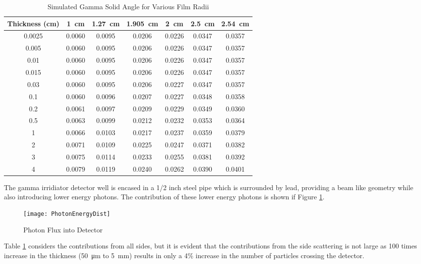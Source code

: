 \documentclass[draftcls,onecolumn]{IEEEtran}
\begin{document}
\begin{table}
	\centering
	\caption{Simulated Gamma Solid Angle for Various Film Radii}
	\label{tab:GammaSolidAngle}
	\begin{tabular}{c | c c c c c c}
Thickness (\si{\cm})	&	\SI{1}{\cm}	&	\SI{1.27}{\cm}	&	\SI{1.905}{\cm}	&	\SI{2}{\cm}	&	\SI{2.5}{\cm}	&	\SI{2.54}{\cm} \\ \hline
0.0025	&	0.0060	&	0.0095	&	0.0206	&	0.0226	&	0.0347	&	0.0357\\
0.005	&	0.0060	&	0.0095	&	0.0206	&	0.0226	&	0.0347	&	0.0357\\
0.01	&	0.0060	&	0.0095	&	0.0206	&	0.0226	&	0.0347	&	0.0357\\
0.015	&	0.0060	&	0.0095	&	0.0206	&	0.0226	&	0.0347	&	0.0357\\
0.03	&	0.0060	&	0.0095	&	0.0206	&	0.0227	&	0.0347	&	0.0357\\
0.1	&	0.0060	&	0.0096	&	0.0207	&	0.0227	&	0.0348	&	0.0358\\
0.2	&	0.0061	&	0.0097	&	0.0209	&	0.0229	&	0.0349	&	0.0360\\
0.5	&	0.0063	&	0.0099	&	0.0212	&	0.0232	&	0.0353	&	0.0364\\
1	&	0.0066	&	0.0103	&	0.0217	&	0.0237	&	0.0359	&	0.0379\\
2	&	0.0071	&	0.0109	&	0.0225	&	0.0247	&	0.0371	&	0.0382\\
3	&	0.0075	&	0.0114	&	0.0233	&	0.0255	&	0.0381	&	0.0392\\
4	&	0.0079	&	0.0119	&	0.0240	&	0.0262	&	0.0390	&	0.0401\\
	\end{tabular}
\end{table}
The gamma irridiator detector well is encased in a 1/2 inch steel pipe which is surrounded by lead, providing a beam like geometry while also introducing lower energy photons. 
The contribution of these lower energy photons is shown if Figure \ref{fig:PhotonFluxAllEnergies}.
\begin{figure}
  \texttt{[image: PhotonEnergyDist]}
	\caption{Photon Flux into Detector}
  \label{fig:PhotonFluxAllEnergies}
\end{figure}
Table \ref{tab:GammaSolidAngle} considers the contributions from all sides, but it is evident that the contributions from the side scattering is not large as 100 times increase in the thickness (\SI{50}{\um} to \SI{5}{\mm}) results in only a 4\% increase in the number of particles crossing the detector.
\end{document}
